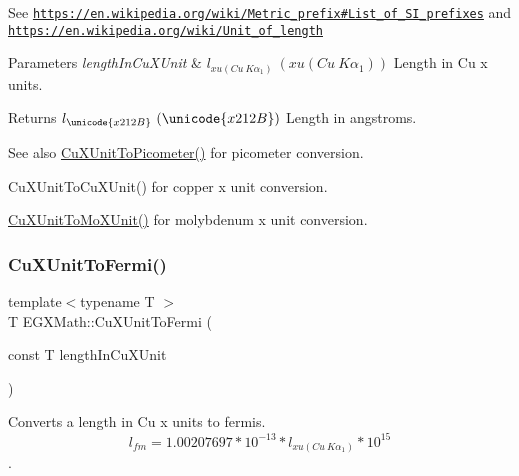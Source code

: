 See \href{https://en.wikipedia.org/wiki/Metric_prefix#List_of_SI_prefixes}{\tt https\+://en.\+wikipedia.\+org/wiki/\+Metric\+\_\+prefix\#\+List\+\_\+of\+\_\+\+S\+I\+\_\+prefixes} and \href{https://en.wikipedia.org/wiki/Unit_of_length}{\tt https\+://en.\+wikipedia.\+org/wiki/\+Unit\+\_\+of\+\_\+length} 
\begin{DoxyParams}{Parameters}
{\em length\+In\+Cu\+X\+Unit} & $ l_{xu(Cu\ K\alpha_1)}\ (xu(Cu\ K\alpha_1))$ Length in Cu x units. \\
\hline
\end{DoxyParams}
\begin{DoxyReturn}{Returns}
$ l_{\unicode{x212B}}\ (\unicode{x212B})$ Length in angstroms. 
\end{DoxyReturn}
\begin{DoxySeeAlso}{See also}
\mbox{\hyperlink{group___e_g_x_math-_conversions-_length_conversions-_non-_s_i-_cu_x_unit-_s_i_ga789ff4191ad452d5dc54f4bd3d267566}{Cu\+X\+Unit\+To\+Picometer()}} for picometer conversion. 

Cu\+X\+Unit\+To\+Cu\+X\+Unit() for copper x unit conversion. 

\mbox{\hyperlink{group___e_g_x_math-_conversions-_length_conversions-_non-_s_i-_cu_x_unit-_non-_s_i_gad93f4b59cc8e8f052b3cf8cad7c7b173}{Cu\+X\+Unit\+To\+Mo\+X\+Unit()}} for molybdenum x unit conversion. 
\end{DoxySeeAlso}
\mbox{\label{group___e_g_x_math-_conversions-_length_conversions-_non-_s_i-_cu_x_unit-_non-_s_i_ga14c8dd2723d4482371d1ec42465f417f}} 
\subsubsection{\texorpdfstring{Cu\+X\+Unit\+To\+Fermi()}{CuXUnitToFermi()}}
{\footnotesize\ttfamily template$<$typename T $>$ \\
T E\+G\+X\+Math\+::\+Cu\+X\+Unit\+To\+Fermi (\begin{DoxyParamCaption}\item[{const T}]{length\+In\+Cu\+X\+Unit }\end{DoxyParamCaption})}



Converts a length in Cu x units to fermis. \[ l_{fm}=1.00207697*10^{-13} * l_{xu(Cu\ K\alpha_1)} * 10^{15} \]. 


